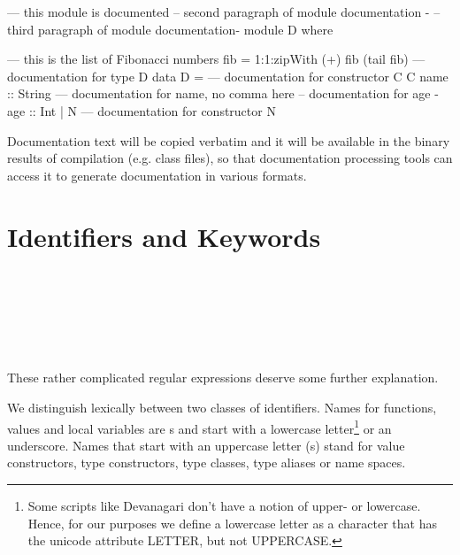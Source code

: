 \begin{code}
--- this module is documented
{-- second paragraph of module documentation -}
{-- third paragraph of module documentation-}
module D where

--- this is the list of Fibonacci numbers
fib = 1:1:zipWith (+) fib (tail fib)
--- documentation for type D
data D = 
      --- documentation for constructor C
      C { name :: String --- documentation for name, no comma here
          {-- documentation for age -}
          age :: Int }
    | N                  --- documentation for constructor N
\end{code}

Documentation text will be copied verbatim and it will be available in the binary results of compilation (e.g. \java{} class files), so that documentation processing tools can access it to generate documentation in various formats.


\section{Identifiers and Keywords}  \label {qualified names}

\begin{flushleft}

 \\

 \\


\\

     \oder{}   \oder{} \\
     \oder{}    \oder{} \\
\end{flushleft}

These rather complicated regular expressions deserve some further
explanation.

We distinguish lexically between two classes of identifiers.
Names for functions, values and local variables are s
and start with a lowercase letter\footnote{Some scripts like Devanagari don't have a notion of upper- or lowercase. Hence, for our purposes we define a lowercase letter as a character that has the unicode attribute LETTER, but not UPPERCASE.} or an underscore.
Names that start with an uppercase letter (s)
stand for value constructors,
type constructors, type classes, type aliases or name spaces.

